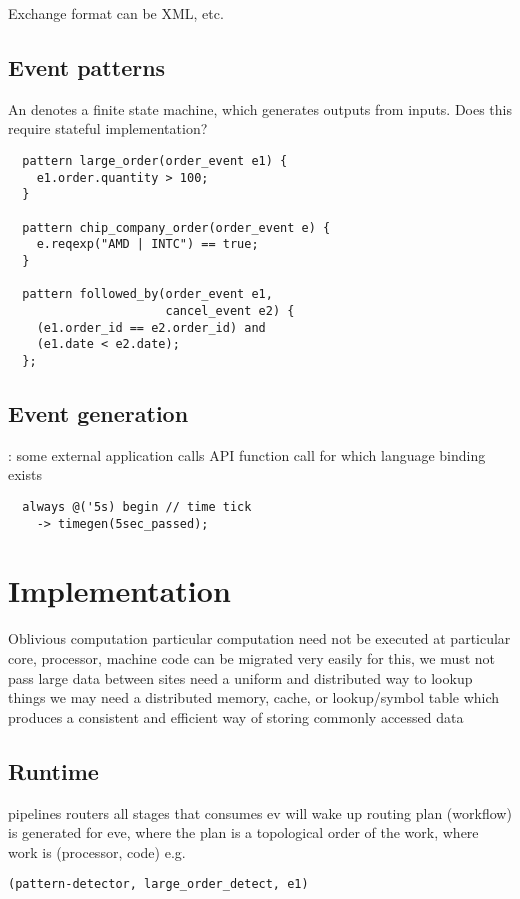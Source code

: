 \documentclass{pamsbook}
\begin{document}
{\bit
\w Exchange format can be XML, etc.
\eit

\subsection{Event patterns}
\bit
\w An  denotes a finite state machine, which generates
outputs from inputs.
\w Does this require stateful implementation?
\eit
{\small
\begin{verbatim} 
  pattern large_order(order_event e1) {
    e1.order.quantity > 100;
  }

  pattern chip_company_order(order_event e) {
    e.reqexp("AMD | INTC") == true;
  }

  pattern followed_by(order_event e1, 
                      cancel_event e2) {
    (e1.order_id == e2.order_id) and 
    (e1.date < e2.date);
  };
\end{verbatim}
}

\subsection{Event generation}
\bit
\w {}: some external application calls API function call for which
language binding exists
\w {}

{\small
\begin{verbatim}  
  always @('5s) begin // time tick
    -> timegen(5sec_passed);
\end{verbatim}
}
\eit

\section{Implementation}
\bit
\w Oblivious computation
  \bit
  \w particular computation need not be executed at particular core,
  processor, machine
  \w code can be migrated very easily
  \w for this, we must not pass large data between sites
  \w need a uniform and distributed way to lookup things
  \w we may need a distributed memory, cache, or lookup/symbol table which
  produces a consistent and efficient way of storing commonly accessed data
  \eit
\eit
\subsection{Runtime}
\bit
\w pipelines
\w routers
\w all stages that consumes ev will wake up
\w routing plan (workflow) is generated for eve, where the plan is a
topological order of the work, where work is
   (processor, code) e.g. 
{\small
\begin{verbatim}
(pattern-detector, large_order_detect, e1)
\end{verbatim}
}

}
\end{document}

